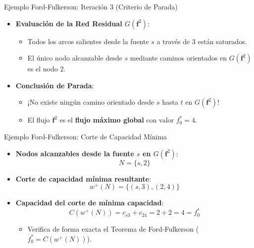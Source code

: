 \documentclass[
  ignorenonframetext,
]{beamer}
\providecommand{\tightlist}{%
  \setlength{\itemsep}{0pt}\setlength{\parskip}{0pt}}
\begin{document}
\begin{frame}{Ejemplo Ford-Fulkerson: Iteración 3 (Criterio de Parada)}
\label{ejemplo-ford-fulkerson-iteraciuxf3n-3-criterio-de-parada}
\begin{itemize}
\tightlist
\item
  \textbf{Evaluación de la Red Residual \(G(\mathbf{f}^2)\)}:

  \begin{itemize}
  \tightlist
  \item
    Todos los arcos salientes desde la fuente \(s\) a través de \(3\)
    están saturados.
  \item
    El único nodo alcanzable desde \(s\) mediante caminos orientados en
    \(G(\mathbf{f}^2)\) es el nodo \(2\).
  \end{itemize}
\item
  \textbf{Conclusión de Parada}:

  \begin{itemize}
  \tightlist
  \item
    ¡No existe ningún camino orientado desde \(s\) hasta \(t\) en
    \(G(\mathbf{f}^2)\)!
  \item
    El flujo \(\mathbf{f}^2\) es el \textbf{flujo máximo global} con
    valor \(f_0^* = 4\).
  \end{itemize}
\end{itemize}
\end{frame}

\begin{frame}{Ejemplo Ford-Fulkerson: Corte de Capacidad Mínima}
\label{ejemplo-ford-fulkerson-corte-de-capacidad-muxednima}
\begin{itemize}
\item
  \textbf{Nodos alcanzables desde la fuente \(s\) en
  \(G(\mathbf{f}^2)\)}: \[N = \{s, 2\}\]
\item
  \textbf{Corte de capacidad mínima resultante}:
  \[w^+(N) = \{(s,3), (2,4)\}\]
\item
  \textbf{Capacidad del corte de mínima capacidad}:
  \[C(w^+(N)) = c_{s3} + c_{24} = 2 + 2 = 4 = f_0^*\]

  \begin{itemize}
  \tightlist
  \item
    Verifica de forma exacta el Teorema de Ford-Fulkerson
    (\(f_0^* = C(w^+(N))\)).
  \end{itemize}
\end{itemize}
\end{frame}
\end{document}

